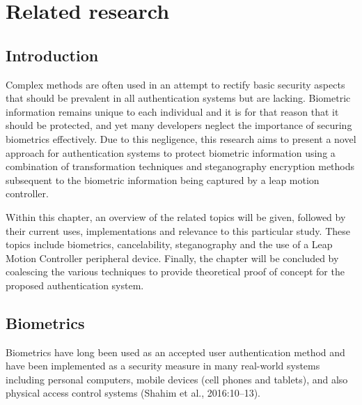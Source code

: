 
\chapter{Related research}



\section[Introduction]{Introduction}
Complex methods are often used in an attempt to rectify basic security aspects that should be prevalent in all authentication systems but are lacking. Biometric information remains unique to each individual and it is for that reason that it should be protected, and yet many developers neglect the importance of securing biometrics effectively. Due to this negligence, this research aims to present a novel approach for authentication systems to protect biometric information using a combination of transformation techniques and steganography encryption methods subsequent to the biometric information being captured by a leap motion controller. 

Within this chapter, an overview of the related topics will be given, followed by their current uses, implementations and relevance to this particular study. These topics include biometrics, cancelability, steganography and the use of a Leap Motion Controller peripheral device. Finally, the chapter will be concluded by coalescing the various techniques to provide theoretical proof of concept for the proposed authentication system.


\section[Biometrics]{Biometrics}
Biometrics have long been used as an accepted user authentication method and have been implemented as a security measure in many real-world systems including personal computers, mobile devices (cell phones and tablets), and also physical access control systems (Shahim et al., 2016:10–13).

